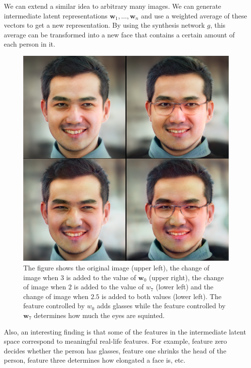 \documentclass[conference]{IEEEtran}
\begin{document}
We can extend a similar idea to arbitrary many images. We can generate intermediate latent representations $\mathbf{w}_1, \hdots, \mathbf{w}_n$ and use a weighted average of these vectors to get a new representation. By using the synthesis network $g$, this average can be transformed into a new face that contains a certain amount of each person in it.
\begin{figure}[!htbp]
\begin{center}
	\includegraphics[width=1\columnwidth]{./images/w0-from-0-to-3.png}
	\caption{The figure shows the original image (upper left), the change of image when $3$ is added to the value of $\mathbf{w}_0$ (upper right), the change of image when $2$ is added to the value of $w_7$ (lower left) and the change of image when $2.5$ is added to both values (lower left). The feature controlled by $w_0$ adds glasses while the feature controlled by $\mathbf{w}_7$ determines how much the eyes are squinted.}
	\label{fig:figure9}
\end{center}
\end{figure}

Also, an interesting finding is that some of the features in the intermediate latent space correspond to meaningful real-life features. For example, feature zero decides whether the person has glasses, feature one shrinks the head of the person, feature three determines how elongated a face is, etc.
\end{document}
